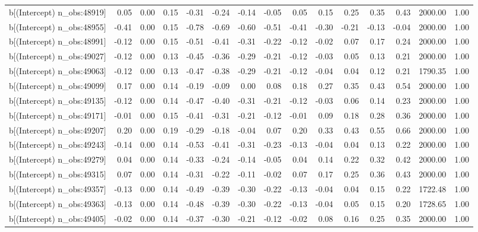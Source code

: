 \begin{table}[ht]
\begin{tabular}{rrrrrrrrrrrrrrr}
  b[(Intercept) n\_obs:48919] & 0.05 & 0.00 & 0.15 & -0.31 & -0.24 & -0.14 & -0.05 & 0.05 & 0.15 & 0.25 & 0.35 & 0.43 & 2000.00 & 1.00 \\ 
  b[(Intercept) n\_obs:48955] & -0.41 & 0.00 & 0.15 & -0.78 & -0.69 & -0.60 & -0.51 & -0.41 & -0.30 & -0.21 & -0.13 & -0.04 & 2000.00 & 1.00 \\ 
  b[(Intercept) n\_obs:48991] & -0.12 & 0.00 & 0.15 & -0.51 & -0.41 & -0.31 & -0.22 & -0.12 & -0.02 & 0.07 & 0.17 & 0.24 & 2000.00 & 1.00 \\ 
  b[(Intercept) n\_obs:49027] & -0.12 & 0.00 & 0.13 & -0.45 & -0.36 & -0.29 & -0.21 & -0.12 & -0.03 & 0.05 & 0.13 & 0.21 & 2000.00 & 1.00 \\ 
  b[(Intercept) n\_obs:49063] & -0.12 & 0.00 & 0.13 & -0.47 & -0.38 & -0.29 & -0.21 & -0.12 & -0.04 & 0.04 & 0.12 & 0.21 & 1790.35 & 1.00 \\ 
  b[(Intercept) n\_obs:49099] & 0.17 & 0.00 & 0.14 & -0.19 & -0.09 & 0.00 & 0.08 & 0.18 & 0.27 & 0.35 & 0.43 & 0.54 & 2000.00 & 1.00 \\ 
  b[(Intercept) n\_obs:49135] & -0.12 & 0.00 & 0.14 & -0.47 & -0.40 & -0.31 & -0.21 & -0.12 & -0.03 & 0.06 & 0.14 & 0.23 & 2000.00 & 1.00 \\ 
  b[(Intercept) n\_obs:49171] & -0.01 & 0.00 & 0.15 & -0.41 & -0.31 & -0.21 & -0.12 & -0.01 & 0.09 & 0.18 & 0.28 & 0.36 & 2000.00 & 1.00 \\ 
  b[(Intercept) n\_obs:49207] & 0.20 & 0.00 & 0.19 & -0.29 & -0.18 & -0.04 & 0.07 & 0.20 & 0.33 & 0.43 & 0.55 & 0.66 & 2000.00 & 1.00 \\ 
  b[(Intercept) n\_obs:49243] & -0.14 & 0.00 & 0.14 & -0.53 & -0.41 & -0.31 & -0.23 & -0.13 & -0.04 & 0.04 & 0.13 & 0.22 & 2000.00 & 1.00 \\ 
  b[(Intercept) n\_obs:49279] & 0.04 & 0.00 & 0.14 & -0.33 & -0.24 & -0.14 & -0.05 & 0.04 & 0.14 & 0.22 & 0.32 & 0.42 & 2000.00 & 1.00 \\ 
  b[(Intercept) n\_obs:49315] & 0.07 & 0.00 & 0.14 & -0.31 & -0.22 & -0.11 & -0.02 & 0.07 & 0.17 & 0.25 & 0.36 & 0.43 & 2000.00 & 1.00 \\ 
  b[(Intercept) n\_obs:49357] & -0.13 & 0.00 & 0.14 & -0.49 & -0.39 & -0.30 & -0.22 & -0.13 & -0.04 & 0.04 & 0.15 & 0.22 & 1722.48 & 1.00 \\ 
  b[(Intercept) n\_obs:49363] & -0.13 & 0.00 & 0.14 & -0.48 & -0.39 & -0.30 & -0.22 & -0.13 & -0.04 & 0.05 & 0.15 & 0.20 & 1728.65 & 1.00 \\ 
  b[(Intercept) n\_obs:49405] & -0.02 & 0.00 & 0.14 & -0.37 & -0.30 & -0.21 & -0.12 & -0.02 & 0.08 & 0.16 & 0.25 & 0.35 & 2000.00 & 1.00 \\ 

\end{tabular}
\end{table}
